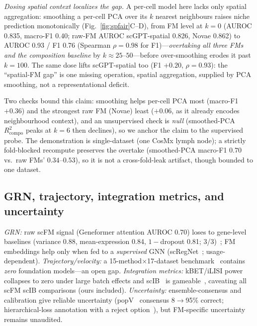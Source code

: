 \documentclass[journal]{IEEEtran}
\begin{document}
\emph{Dosing spatial context localizes the gap.} A per-cell model here lacks only spatial aggregation: smoothing a per-cell PCA over its $k$ nearest neighbours raises niche prediction monotonically (Fig.~\ref{fig:spfair}C--D), from FM level at $k{=}0$ (AUROC 0.835, macro-F1 0.40; raw-FM AUROC scGPT-spatial 0.826, Novae 0.862) to AUROC 0.93 / F1 0.76 (Spearman $\rho=0.98$ for F1)---\emph{overtaking all three FMs and the composition baseline} by $k\approx25$--$50$---before over-smoothing erodes it past $k{=}100$. The same dose lifts scGPT-spatial too (F1 $+0.20$, $\rho=0.93$): the ``spatial-FM gap'' is one missing operation, spatial aggregation, supplied by PCA smoothing, not a representational deficit.

Two checks bound this claim: smoothing helps per-cell PCA most (macro-F1 $+0.36$) and the strongest raw FM (Novae) least ($+0.06$, as it already encodes neighbourhood context), and an unsupervised check is \emph{null} (smoothed-PCA $R^2_{\mathrm{compo}}$ peaks at $k{=}6$ then declines), so we anchor the claim to the supervised probe. The demonstration is single-dataset (one CosMx lymph node); a strictly fold-blocked recompute preserves the overtake (smoothed-PCA macro-F1 $0.70$ vs.\ raw FMs' $0.34$--$0.53$), so it is not a cross-fold-leak artifact, though bounded to one dataset.

\subsection{GRN, trajectory, integration metrics, and uncertainty}
\emph{GRN:} raw scFM signal (Geneformer attention AUROC 0.70) loses to gene-level baselines (variance 0.88, mean-expression 0.84, $1-$dropout 0.81; 3/3)~\cite{kendiukhov2026}; FM embeddings help only when fed to a \emph{supervised} GNN (scRegNet~\cite{scregnet2025}; usage-dependent). \emph{Trajectory/velocity:} a 15-method$\times$17-dataset benchmark~\cite{velobench2026} contains \emph{zero} foundation models---an open gap. \emph{Integration metrics:} kBET/iLISI power collapses to zero under large batch effects and scIB~\cite{luecken2022} is gameable~\cite{rbet2025,scibe2025}, caveating all scFM scIB comparisons (ours included). \emph{Uncertainty:} ensemble-consensus and calibration give reliable uncertainty (popV~\cite{popv2024} consensus 8$\to$95\% correct; hierarchical-loss annotation with a reject option~\cite{hce2026,theunissen2024}), but FM-specific uncertainty remains unaudited.
\end{document}
